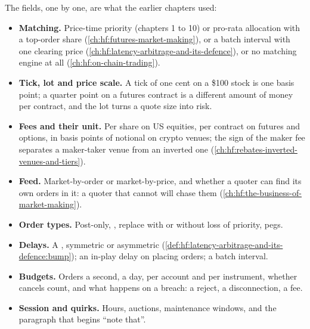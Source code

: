 The fields, one by one, are what the earlier chapters used:
\begin{itemize}
\item \textbf{Matching.} Price-time priority (chapters 1 to 10) or pro-rata allocation with a top-order share (\cref{ch:hf:futures-market-making}),
or a batch interval with one clearing price (\cref{ch:hf:latency-arbitrage-and-its-defence}), or no matching engine at all
(\cref{ch:hf:on-chain-trading}).
\item \textbf{Tick, lot and price scale.} A tick of one cent on a \$100 stock is one basis point; a quarter point on a futures contract is a
different amount of money per contract, and the lot turns a quote size into risk.
\item \textbf{Fees and their unit.} Per share on US equities, per contract on futures and options, in basis points of notional on crypto venues;
the sign of the maker fee separates a maker-taker venue from an inverted one (\cref{ch:hf:rebates-inverted-venues-and-tiers}).
\item \textbf{Feed.} Market-by-order or market-by-price, and whether a quoter can find its own orders in it: a quoter that cannot will chase them
(\cref{ch:hf:the-business-of-market-making}).
\item \textbf{Order types.} Post-only, , replace with or without loss of priority, pegs.
\item \textbf{Delays.} A , symmetric or asymmetric (\cref{def:hf:latency-arbitrage-and-its-defence:bump}); an in-play delay on
placing orders; a batch interval.
\item \textbf{Budgets.} Orders a second, a day, per account and per instrument, whether cancels count, and what happens on a breach: a reject, a
disconnection, a fee.
\item \textbf{Session and quirks.} Hours, auctions, maintenance windows, and the paragraph that begins ``note that''.
\end{itemize}

